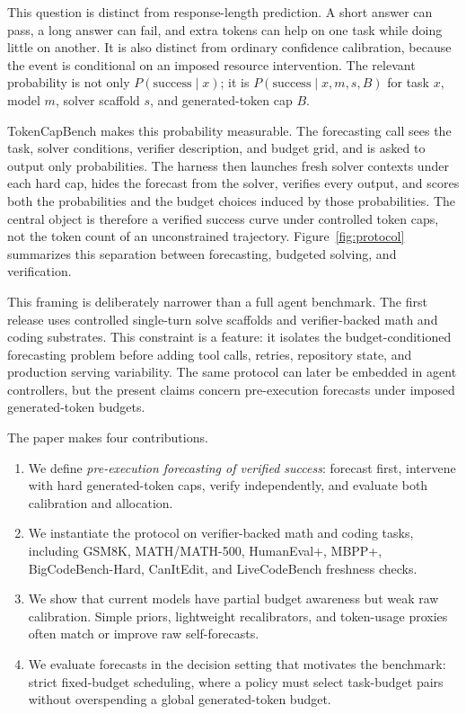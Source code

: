 \documentclass{article}
\newcommand{\bench}{TokenCapBench\xspace}
\newcommand{\success}{\mathrm{success}}
\newcommand{\budget}{B}
\begin{document}
This question is distinct from response-length prediction. A short answer can pass, a long answer can fail, and extra tokens can help on one task while doing little on another. It is also distinct from ordinary confidence calibration, because the event is conditional on an imposed resource intervention. The relevant probability is not only $P(\success \mid x)$; it is $P(\success \mid x,m,s,\budget)$ for task $x$, model $m$, solver scaffold $s$, and generated-token cap $\budget$.

\bench makes this probability measurable. The forecasting call sees the task, solver conditions, verifier description, and budget grid, and is asked to output only probabilities. The harness then launches fresh solver contexts under each hard cap, hides the forecast from the solver, verifies every output, and scores both the probabilities and the budget choices induced by those probabilities. The central object is therefore a verified success curve under controlled token caps, not the token count of an unconstrained trajectory. Figure~\ref{fig:protocol} summarizes this separation between forecasting, budgeted solving, and verification.

This framing is deliberately narrower than a full agent benchmark. The first release uses controlled single-turn solve scaffolds and verifier-backed math and coding substrates. This constraint is a feature: it isolates the budget-conditioned forecasting problem before adding tool calls, retries, repository state, and production serving variability. The same protocol can later be embedded in agent controllers, but the present claims concern pre-execution forecasts under imposed generated-token budgets.

The paper makes four contributions.
\begin{enumerate}[leftmargin=*]
    \item We define \emph{pre-execution forecasting of verified success}: forecast first, intervene with hard generated-token caps, verify independently, and evaluate both calibration and allocation.
    \item We instantiate the protocol on verifier-backed math and coding tasks, including GSM8K, MATH/MATH-500, HumanEval+, MBPP+, BigCodeBench-Hard, CanItEdit, and LiveCodeBench freshness checks.
    \item We show that current models have partial budget awareness but weak raw calibration. Simple priors, lightweight recalibrators, and token-usage proxies often match or improve raw self-forecasts.
    \item We evaluate forecasts in the decision setting that motivates the benchmark: strict fixed-budget scheduling, where a policy must select task-budget pairs without overspending a global generated-token budget.
\end{enumerate}
\end{document}
